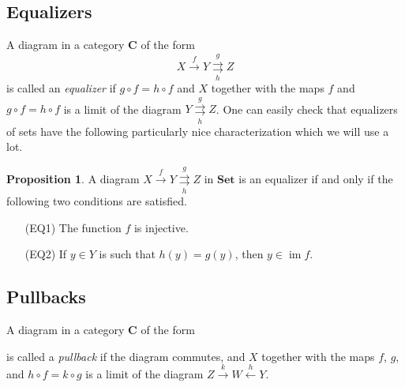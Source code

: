 \documentclass[oneside,11pt]{amsart}
\newcommand{\bC}{\ensuremath{\textbf{C}}}
\newcommand{\bSet}{\ensuremath{\textbf{Set}}}
\newcommand{\im}{\operatorname{im}}
\theoremstyle{definition}
\newtheorem{proof techniques}{Proof Techniques}
\newtheorem{proposition}{Proposition}
\begin{document}
\subsection{Equalizers} 

A diagram in a category $\bC$ of the form 
\begin{equation*}
X \overset{f}{\to} Y \underset{h}{\overset{g}{\rightrightarrows}} Z
\end{equation*}
is called an \emph{equalizer} if $g \circ f = h \circ f$ and $X$ together with the maps $f$ and $g \circ f = h \circ f$ is a limit of the diagram $Y \underset{h}{\overset{g}{\rightrightarrows}} Z$. One can easily check that equalizers of sets have the following particularly nice characterization which we will use a lot. 

\begin{proposition}\label{prop: characterization of equalizers in set}
A diagram $X \overset{f}{\to} Y \underset{h}{\overset{g}{\rightrightarrows}} Z$ in $\bSet$ is an equalizer if and only if the following two conditions are satisfied. 
\begin{itemize}

\item[(EQ1)] The function $f$ is injective.

\item[(EQ2)] If $y \in Y$ is such that $h(y) = g(y)$, then $y \in \im f$. 

\end{itemize}
\end{proposition}



\subsection{Pullbacks}

A diagram in a category $\bC$ of the form 
\begin{center}
\end{center}
is called a \emph{pullback} if the diagram commutes, and $X$ together with the maps $f$, $g$, and $h \circ f = k \circ g$ is a limit of the diagram $Z \overset{k}{\longrightarrow} W \overset{h}{\longleftarrow} Y$. 

\end{document}
